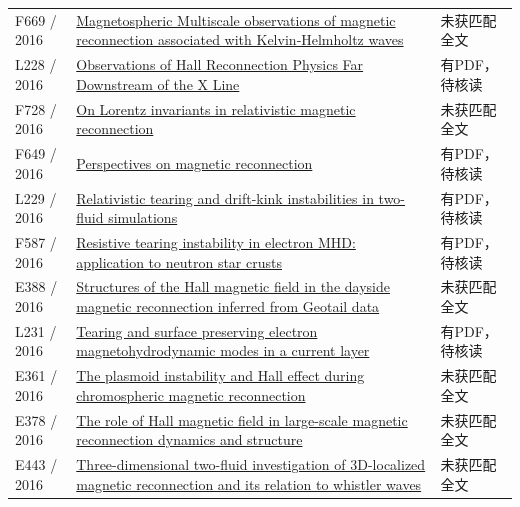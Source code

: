 \begin{longtable}{P{24mm}P{97mm}P{27mm}}
F669 / 2016 & \href{https://doi.org/10.1002/2016gl068783}{Magnetospheric Multiscale observations of magnetic reconnection associated with Kelvin‐Helmholtz waves} & 未获匹配全文\\

L228 / 2016 & \href{https://doi.org/10.1103/physrevlett.117.185102}{Observations of Hall Reconnection Physics Far Downstream of the X Line} & 有PDF，待核读\\

F728 / 2016 & \href{https://doi.org/10.1063/1.4961431}{On Lorentz invariants in relativistic magnetic reconnection} & 未获匹配全文\\

F649 / 2016 & \href{https://doi.org/10.1098/rspa.2016.0479}{Perspectives on magnetic reconnection} & 有PDF，待核读\\

L229 / 2016 & \href{https://doi.org/10.1093/mnras/stw384}{Relativistic tearing and drift-kink instabilities in two-fluid simulations} & 有PDF，待核读\\

F587 / 2016 & \href{https://doi.org/10.1093/mnras/stw2309}{Resistive tearing instability in electron MHD: application to neutron star crusts} & 有PDF，待核读\\

E388 / 2016 & \href{http://ui.adsabs.harvard.edu/abs/2016AGUFMSM13A2184T/abstract}{Structures of the Hall magnetic field in the dayside magnetic reconnection inferred from Geotail data} & 未获匹配全文\\

L231 / 2016 & \href{https://doi.org/10.1063/1.4943053}{Tearing and surface preserving electron magnetohydrodynamic modes in a current layer} & 有PDF，待核读\\

E361 / 2016 & \href{https://ui.adsabs.harvard.edu/abs/2016AAS...22714103M/abstract}{The plasmoid instability and Hall effect during chromospheric magnetic reconnection} & 未获匹配全文\\

E378 / 2016 & \href{https://confit.atlas.jp/guide/event/jpgu2016/subject/PEM17-11/detail}{The role of Hall magnetic field in large-scale magnetic reconnection dynamics and structure} & 未获匹配全文\\

E443 / 2016 & \href{http://absimage.aps.org/image/DPP16/MWS_DPP16-2016-000133.pdf}{Three-dimensional two-fluid investigation of 3D-localized magnetic reconnection and its relation to whistler waves} & 未获匹配全文\\


\end{longtable}
